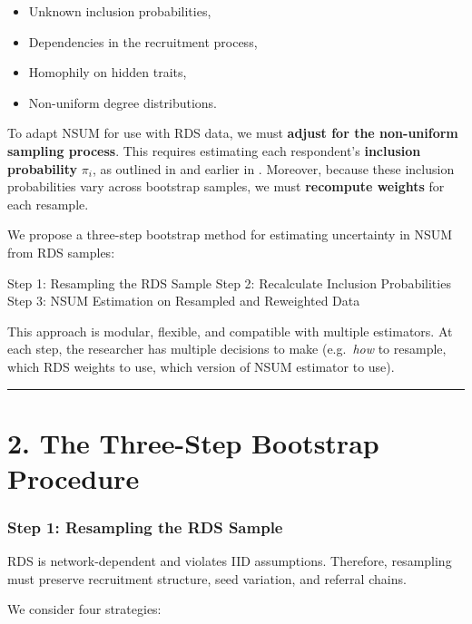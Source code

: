 \documentclass[
  12pt,
  letterpaper,
  DIV=11,
  numbers=noendperiod]{scrartcl}
\theoremstyle{plain}
\theoremstyle{definition}
\begin{document}
\begin{itemize}
\item
  Unknown inclusion probabilities,
\item
  Dependencies in the recruitment process,
\item
  Homophily on hidden traits,
\item
  Non-uniform degree distributions.
\end{itemize}

To adapt NSUM for use with RDS data, we must \textbf{adjust for the
non-uniform sampling process}. This requires estimating each
respondent's \textbf{inclusion probability} \(\pi_i\), as outlined in
\textcite{feeh16-generaling} and earlier in \textcite{salf06-variance}.
Moreover, because these inclusion probabilities vary across bootstrap
samples, we must \textbf{recompute weights} for each resample.

We propose a three-step bootstrap method for estimating uncertainty in
NSUM from RDS samples:

Step 1: Resampling the RDS Sample Step 2: Recalculate Inclusion
Probabilities Step 3: NSUM Estimation on Resampled and Reweighted Data

This approach is modular, flexible, and compatible with multiple
estimators. At each step, the researcher has multiple decisions to make
(e.g.~\emph{how} to resample, which RDS weights to use, which version of
NSUM estimator to use).

\begin{center}\rule{0.5\linewidth}{0.5pt}\end{center}

\section{2. The Three-Step Bootstrap
Procedure}\label{the-three-step-bootstrap-procedure}

\subsubsection{Step 1: Resampling the RDS
Sample}\label{step-1-resampling-the-rds-sample-1}

RDS is network-dependent and violates IID assumptions. Therefore,
resampling must preserve recruitment structure, seed variation, and
referral chains.

We consider four strategies:
\end{document}

